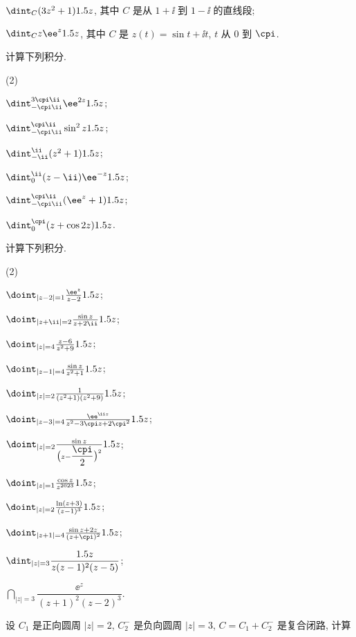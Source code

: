 \begin{homework}
\begin{homework}
\begin{subhomework}
        \item $\dint_C (3z^2+1) \d z$, 其中 $C$ 是从 $1+\ii$ 到 $1-\ii$ 的直线段;
        \item $\dint_C z\ee^z \d z$, 其中 $C$ 是 $z(t)=\sin t+\ii t$, $t$ 从 $0$ 到 $\cpi$.
      \end{subhomework}
    \item 计算下列积分.
      \begin{subhomework}(2)
        \item $\dint_{-\cpi\ii}^{3\cpi\ii}\ee^{2z}\d z$;
        \item $\dint_{-\cpi\ii}^{\cpi\ii}\sin^2z\d z$;
        \item $\dint_{-\ii}^{\ii}(z^2+1)\d z$;
        \item $\dint_0^\ii (z-\ii)\ee^{-z}\d z$;
        \item $\dint_{-\cpi\ii}^{\cpi\ii}(\ee^z+1)\d z$;
        \item $\dint_0^\cpi (z+\cos 2z)\d z$.
      \end{subhomework}
    \item 计算下列积分.
      \begin{subhomework}(2)
        \item $\doint_{|z-2|=1}\frac{\ee^z}{z-2}\d z$;
        \item $\doint_{|z+\ii|=2}\frac{\sin z}{z+2\ii}\d z$;
        \item $\doint_{|z|=4}\frac{z-6}{z^2+9}\d z$;
        \item $\doint_{|z-1|=4}\frac{\sin z}{z^2+1}\d z$;
        \item $\doint_{|z|=2}\frac1{(z^2+1)(z^2+9)}\d z$;
        \item $\doint_{|z-3|=4}\frac{\ee^{\ii z}}{z^2-3\cpi z+2\cpi^2}\d z$;
        \item $\doint_{|z|=2}\frac{\sin z}{\bigl(z-\dfrac\cpi 2\bigr)^2}\d z$;
        \item $\doint_{|z|=1}\frac{\cos z}{z^{2023}}\d z$;
        \item $\doint_{|z|=2}\frac{\ln(z+3)}{(z-1)^3}\d z$;
        \item $\doint_{|z+1|=4}\frac{\sin z+2z}{(z+\cpi)^2}\d z$;
        \item $\dint_{|z|=3}\dfrac{\d z}{z(z-1)^2(z-5)}$;
        \item $\dint_{|z|=3}\dfrac{\ee^z}{(z+1)^2(z-2)^3}$.
      \end{subhomework}
    \item 设 $C_1$ 是正向圆周 $|z|=2$, $C_2^-$ 是负向圆周 $|z|=3$, $C=C_1+C_2^-$ 是复合闭路, 计算 

\end{homework}
\end{homework}
